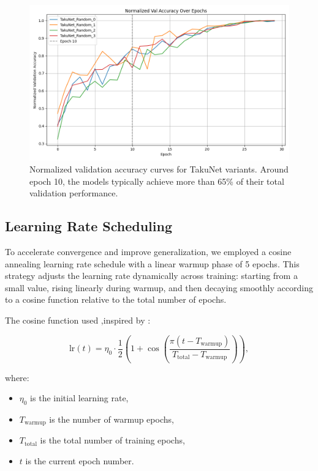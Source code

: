 \begin{figure}[ht]
    \centering
    \includegraphics[width=0.85\linewidth]{Pictures/val_accuracy_comparison.png}
    \caption{Normalized validation accuracy curves for TakuNet variants. Around epoch 10, the models typically achieve more than 65\% of their total validation performance.}
    \label{fig:val_accuracy}
\end{figure}

\clearpage

\subsection{Learning Rate Scheduling}
To accelerate convergence and improve generalization, we employed a cosine annealing learning rate schedule with a linear warmup phase of 5 epochs. This strategy adjusts the learning rate dynamically across training: starting from a small value, rising linearly during warmup, and then decaying smoothly according to a cosine function relative to the total number of epochs. 

The cosine function used ,inspired by \cite{loshchilov2016sgdr} : 

\begin{equation}
\text{lr}(t) = \eta_0 \cdot \frac{1}{2} \left( 1 + \cos\left( \frac{\pi (t - T_\text{warmup})}{T_\text{total} - T_\text{warmup}} \right) \right),
\end{equation}

where:
\begin{itemize}
  \item \( \eta_0 \) is the initial learning rate,
  \item \( T_\text{warmup} \) is the number of warmup epochs,
  \item \( T_\text{total} \) is the total number of training epochs,
  \item \( t \) is the current epoch number.
\end{itemize}


